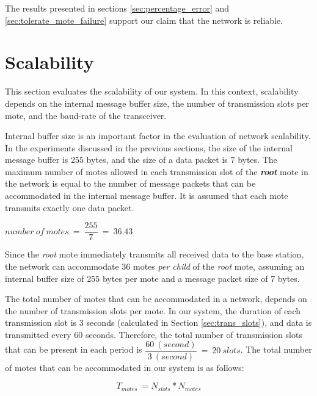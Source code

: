 
The results presented in sections \ref{sec:percentage_error} and \ref{sec:tolerate_mote_failure} support our claim that the network is reliable.

\section{Scalability}
This section evaluates the scalability of our system. In this context, scalability depends on the internal message buffer size, the number of transmission slots per mote, and the baud-rate of the transceiver.

Internal buffer size is an important factor in the evaluation of network scalability. In the experiments discussed in the previous sections, the size of the internal message buffer is 255 bytes, and the size of a data packet is 7 bytes. The maximum number of motes allowed in each transmission slot of the \textit{\textbf{root}} mote in the network is equal to the number of message packets that can be accommodated in the internal message buffer. It is assumed that each mote transmits exactly one data packet.
\begin{center}
$number\ of\ motes\ =\ \dfrac{255}{7}\ =\ 36.43$
\end{center}

Since the \textit{root} mote immediately transmits all received data to the base station, the network can accommodate 36 motes \textit{per child} of the \textit{root} mote, assuming an internal buffer size of 255 bytes per mote and a message packet size of 7 bytes.

The total number of motes that can be accommodated in a network, depends on the number of transmission slots per mote. In our system, the duration of each transmission slot is 3 seconds (calculated in Section \ref{sec:trans_slots}), and data is transmitted every 60 seconds. Therefore, the total number of transmission slots that can be present in each period is $\dfrac{60\ (second)}{3\ (second)}\ =\ 20\ slots$. The total number of motes that can be accommodated in our system is as follows:

\begin{equation}
T_{motes}\ = N_{slots}*N_{motes} 
\end{equation}


